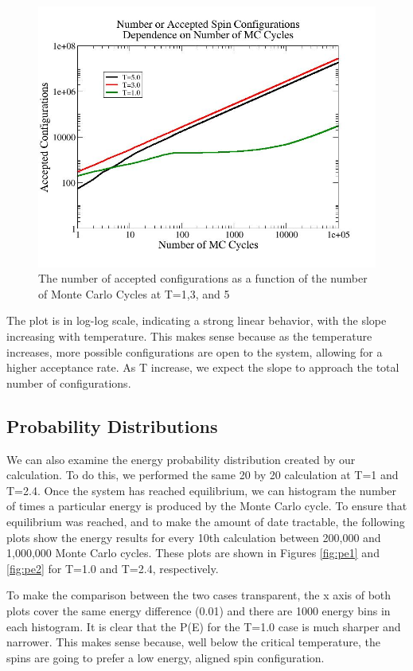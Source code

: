 \documentclass[%
oneside,                 %
final,                   %
10pt]{article}
\begin{document}
\begin{figure}[H]\label{fig:acceptplot}
  \centering
    \includegraphics[width=1.1 \textwidth]{acceptplot.jpg}
    \caption{The number of accepted configurations as a function of the number of Monte Carlo Cycles at T=1,3, and 5}
\end{figure}

The plot is in log-log scale, indicating a strong linear behavior, with the slope increasing with temperature.  This makes sense because as the temperature increases, more possible configurations are open to the system, allowing for a higher acceptance rate.  As T increase, we expect the slope to approach the total number of configurations.

\subsection{Probability Distributions}

We can also examine the energy probability distribution created by our calculation.  To do this, we performed the same 20 by 20 calculation at T=1 and T=2.4.  Once the system has reached equilibrium, we can histogram the number of times a particular energy is produced by the Monte Carlo cycle.  To ensure that equilibrium was reached, and to make the amount of date tractable, the following plots show the energy results for every 10th calculation between 200,000 and 1,000,000 Monte Carlo cycles.  These plots are shown in Figures \ref{fig:pe1} and \ref{fig:pe2} for T=1.0 and T=2.4, respectively.

To make the comparison between the two cases transparent, the x axis of both plots cover the same energy difference (0.01) and there are 1000 energy bins in each histogram.  It is clear that the P(E) for the T=1.0 case is much sharper and narrower.  This makes sense because, well below the critical temperature, the spins are going to prefer a low energy, aligned spin configuration.
\end{document}
